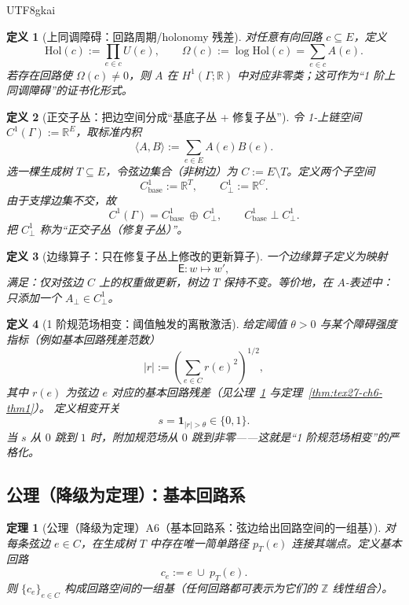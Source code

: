 \documentclass[12pt]{article}
\newtheorem{definition}{定义}[section]
\newtheorem{theorem}{定理}[section]
\newcommand{\RR}{\mathbb{R}}
\newcommand{\ZZ}{\mathbb{Z}}
\newcommand{\indicator}[1]{\mathbf{1}_{#1}}
\begin{document}
\begin{CJK*}{UTF8}{gkai}
\begin{definition}[上同调障碍：回路周期/holonomy 残差]
\label{def:tex27-ch6-d2}
对任意有向回路 $c\subseteq E$，定义
\[
  \mathrm{Hol}(c):=\prod_{e\in c}U(e),\qquad \Omega(c):=\log\mathrm{Hol}(c)=\sum_{e\in c}A(e).
\]
若存在回路使 $\Omega(c)\neq 0$，则 $A$ 在 $H^1(\Gamma;\RR)$ 中对应非零类；这可作为“1 阶上同调障碍”的证书化形式。
\end{definition}

\begin{definition}[正交子丛：把边空间分成“基底子丛 + 修复子丛”]
\label{def:tex27-ch6-d3}
令 1-上链空间 $C^1(\Gamma):=\RR^{E}$，取标准内积
\[
  \langle A,B\rangle := \sum_{e\in E}A(e)B(e).
\]
选一棵生成树 $T\subseteq E$，令弦边集合（非树边）为 $C:=E\setminus T$。定义两个子空间
\[
  C^1_{\mathrm{base}}:=\RR^{T},\qquad C^1_{\perp}:=\RR^{C}.
\]
由于支撑边集不交，故
\[
  C^1(\Gamma)=C^1_{\mathrm{base}}\ \oplus\ C^1_{\perp},\qquad C^1_{\mathrm{base}}\perp C^1_{\perp}.
\]
把 $C^1_{\perp}$ 称为“正交子丛（修复子丛）”。
\end{definition}

\begin{definition}[边缘算子：只在修复子丛上修改的更新算子]
\label{def:tex27-ch6-d4}
一个边缘算子定义为映射
\[
  \mathsf{E}: w \mapsto w',
\]
满足：仅对弦边 $C$ 上的权重做更新，树边 $T$ 保持不变。等价地，在 $A$-表述中：只添加一个 $A_{\perp}\in C^1_{\perp}$。
\end{definition}

\begin{definition}[1 阶规范场相变：阈值触发的离散激活]
\label{def:tex27-ch6-d5}
给定阈值 $\theta>0$ 与某个障碍强度指标（例如基本回路残差范数）
\[
  |r|:=\left(\sum_{e\in C}r(e)^2\right)^{1/2},
\]
其中 $r(e)$ 为弦边 $e$ 对应的基本回路残差（见公理~\ref{thm:tex27-ch6-a6} 与定理~\ref{thm:tex27-ch6-thm1}）。
定义相变开关
\[
  s=\indicator{|r|>\theta}\in\{0,1\}.
\]
当 $s$ 从 $0$ 跳到 $1$ 时，附加规范场从 $0$ 跳到非零——这就是“1 阶规范场相变”的严格化。
\end{definition}

\subsection{公理（降级为定理）：基本回路系}
\label{subsec:tex27-ch6-axiom}

\begin{theorem}[公理（降级为定理）A6（基本回路系：弦边给出回路空间的一组基）]
\label{thm:tex27-ch6-a6}
对每条弦边 $e\in C$，在生成树 $T$ 中存在唯一简单路径 $p_T(e)$ 连接其端点。定义基本回路
\[
  c_e := e\ \cup\ p_T(e).
\]
则 $\{c_e\}_{e\in C}$ 构成回路空间的一组基（任何回路都可表示为它们的 $\ZZ$ 线性组合）。
\end{theorem}


\end{CJK*}
\end{document}
